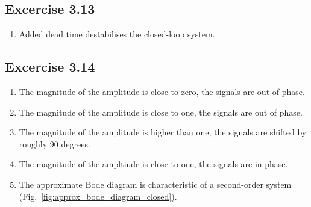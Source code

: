 \documentclass[10pt,twoside,openright]{article}
\begin{document}
\subsection*{Excercise 3.13}
\begin{enumerate}
	\setlength\itemsep{0em}
	\item Added dead time destabilises the closed-loop system.
\end{enumerate}

\subsection*{Excercise 3.14}
\begin{enumerate}
	\setlength\itemsep{0em}
	\item The magnitude of the amplitude is close to zero, the signals are out of phase.
	\item The magnitude of the amplitude is close to one, the signals are out of phase.
	\item The magnitude of the amplitude is higher than one, the signals are shifted by roughly 90 degrees.
	\item The magnitude of the ampltiude is close to one, the signals are in phase.
	\item The approximate Bode diagram is characteristic of a second-order system (Fig.~\ref{fig:approx_bode_diagram_closed}).
\end{enumerate}
\end{document}

